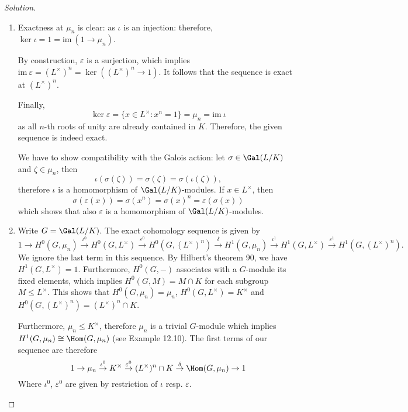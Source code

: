 \documentclass[a4paper,10pt,reqno]{amsart}
\newenvironment{sol}
  {\renewcommand\qedsymbol{$\blacksquare$}\begin{proof}[Solution]}
  {\end{proof}}
\begin{document}
\begin{sol}
    \begin{enumerate}[label=(\roman*)]

    \item Exactness at $\mu_n$ is clear: as $\iota$ is an injection: therefore, $\ker \iota = 1 = \mathrm{im}\ (1 \to \mu_n)$.

    By construction, $\varepsilon$ is a surjection, which implies $\mathrm{im}\ \varepsilon = (L^{\times})^n = \ker ( (L^{\times})^n \to 1)$. It follows that the sequence is exact at $(L^{\times})^n$.

    Finally,
    \[
    \ker \varepsilon = \{ x \in L^{\times}: x^n = 1 \} = \mu_n = \mathrm{im}\ \iota
    \]
    as all $n$-th roots of unity are already contained in $K$. Therefore, the given sequence is indeed exact.

    We have to show compatibility with the Galois action: let $\sigma \in \Gal(L/K)$ and $\zeta \in \mu_n$, then
    \[
    \iota(\sigma(\zeta)) = \sigma(\zeta)= \sigma(\iota(\zeta)),
    \]
    therefore $\iota$ is a homomorphism of $\Gal(L/K)$-modules. If $x \in L^{\times}$, then 
    \[
    \sigma(\varepsilon(x)) = \sigma(x^n) = \sigma(x)^n = \varepsilon(\sigma(x))
    \]
    which shows that also $\varepsilon$ is a homomorphism of $\Gal(L/K)$-modules.
    \item Write $G = \Gal(L/K)$. The exact cohomology sequence is given by
    \[
    1 \to H^0(G,\mu_n) \overset{\iota^0}{\to} H^0(G,L^{\times}) \overset{\varepsilon^0}{\to} H^0(G,(L^{\times})^n) \overset{\delta}{\to} H^1(G,\mu_n) \overset{\iota^1}{\to} H^1(G,L^{\times}) \overset{\varepsilon^1}{\to} H^1(G,(L^{\times})^n).
    \]
    We ignore the last term in this sequence. By Hilbert's theorem 90, we have $H^1(G,L^{\times}) = 1$. Furthermore, $H^0(G,-)$ associates with a $G$-module its fixed elements, which implies $H^0(G,M) = M \cap K$ for each subgroup $M \leq L^{\times}$. This shows that $H^0(G,\mu_n) = \mu_n$, $H^0(G,L^{\times}) = K^{\times}$ and $H^0(G,(L^{\times})^n) = (L^{\times})^n \cap K$.
    
    Furthermore, $\mu_n \leq K^{\times}$, therefore $\mu_n$ is a trivial $G$-module which implies $H^1(G,\mu_n) \cong \Hom(G,\mu_n)$ (see Example 12.10). The first terms of our sequence are therefore
    \[
    1 \to \mu_n \overset{\iota^0}{\to} K^{\times} \overset{\varepsilon^0}{\to} (L^{\times})^n \cap K \overset{\delta}{\to} \Hom(G,\mu_n) \to 1
    \]
    Where $\iota^0$, $\varepsilon^0$ are given by restriction of $\iota$ resp. $\varepsilon$.


\end{enumerate}
\end{sol}
\end{document}
